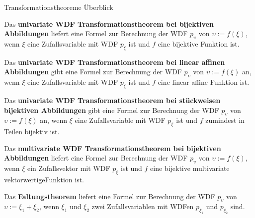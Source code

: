 \documentclass[
  8pt,
  ignorenonframetext,
]{beamer}
\newcommand{\ups}{\upsilon}
\begin{document}
\begin{frame}{Transformationstheoreme}
\protect\hypertarget{transformationstheoreme}{}
Überblick

\footnotesize
\justifying

Das \textbf{univariate WDF Transformationstheorem bei bijektiven
Abbildungen} liefert eine Formel zur Berechnung der WDF \(p_\ups\) von
\(\ups := f(\xi)\), wenn \(\xi\) eine Zufallsvariable mit WDF \(p_\xi\)
ist und \(f\) eine bijektive Funktion ist.

Das \textbf{univariate WDF Transformationstheorem bei linear affinen
Abbildungen} gibt eine Formel zur Berechnung der WDF \(p_\ups\) von
\(\ups := f(\xi)\) an, wenn \(\xi\) eine Zufallsvariable mit WDF
\(p_\xi\) ist und \(f\) eine linear-affine Funktion ist.

Das \textbf{univariate WDF Transformationstheorem bei stückweisen
bijektiven Abbildungen} gibt eine Formel zur Berechnung der WDF
\(p_\ups\) von \(\ups := f(\xi)\) an, wenn \(\xi\) eine Zufallsvariable
mit WDF \(p_\xi\) ist und \(f\) zumindest in Teilen bijektiv ist.

Das \textbf{multivariate WDF Transformationstheorem bei bijektiven
Abbildungen} liefert eine Formel zur Berechnung der WDF \(p_\ups\) von
\(\ups := f(\xi)\), wenn \(\xi\) ein Zufallsvektor mit WDF \(p_\xi\) ist
und \(f\) eine bijektive multivariate vektorwertigeFunktion ist.

Das \textbf{Faltungstheorem} liefert eine Formel zur Berechnung der WDF
\(p_\ups\) von \(\ups := \xi_1 + \xi_2\), wenn \(\xi_1\) und \(\xi_2\)
zwei Zufallsvariablen mit WDFen \(p_{\xi_1}\) und \(p_{\xi_2}\) sind.
\end{frame}
\end{document}
